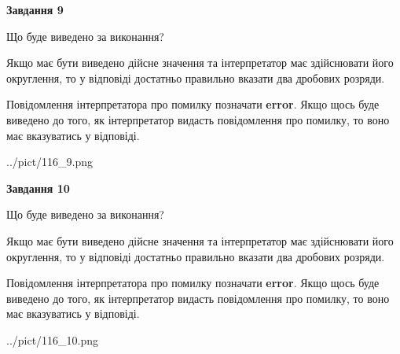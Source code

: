 \documentclass[12pt, ukrainian]{article}
\begin{document}
{\begin {Large}
{\begin {center}\textbf{Завдання 9}\end {center}}\par
Що буде виведено за виконання? \par

Якщо має бути виведено дійсне значення та інтерпретатор має здійснювати його округлення, 
то у відповіді достатньо правильно вказати два дробових розряди.

Повідомлення інтерпретатора про помилку позначати \textbf{error}.
Якщо щось буде виведено до того, як інтерпретатор видасть повідомлення про помилку, 
то воно має вказуватись у відповіді. \par

\begin{center}
	{../pict/116_9.png}
\end{center}
\newpage

{\begin {center}\textbf{Завдання 10}\end {center}}\par
Що буде виведено за виконання? \par

Якщо має бути виведено дійсне значення та інтерпретатор має здійснювати його округлення, 
то у відповіді достатньо правильно вказати два дробових розряди.

Повідомлення інтерпретатора про помилку позначати \textbf{error}.
Якщо щось буде виведено до того, як інтерпретатор видасть повідомлення про помилку, 
то воно має вказуватись у відповіді. \par

\begin{center}
	{../pict/116_10.png}
\end{center}
\newpage

\end {Large}}
\end{document}
